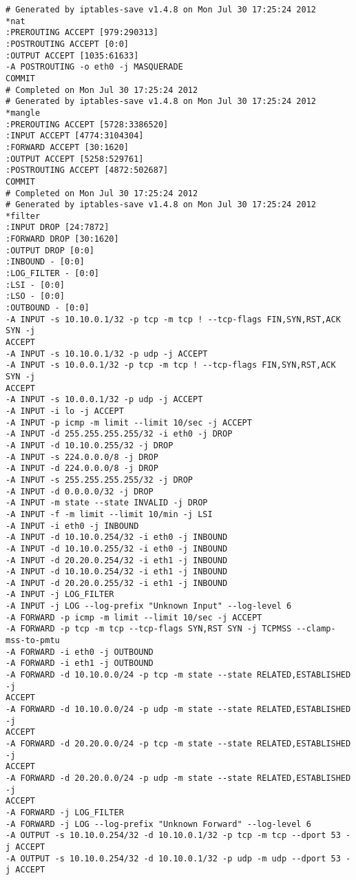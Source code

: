 \documentclass[a4paper,12pt]{report}
\newenvironment{myscriptlisting}
{\begin{list}{}{\setlength{\leftmargin}{1em}}\item\scriptsize\bfseries}
{\end{list}}
\begin{document}
\begin{myscriptlisting}
\begin{verbatim}
# Generated by iptables-save v1.4.8 on Mon Jul 30 17:25:24 2012
*nat
:PREROUTING ACCEPT [979:290313]
:POSTROUTING ACCEPT [0:0]
:OUTPUT ACCEPT [1035:61633]
-A POSTROUTING -o eth0 -j MASQUERADE 
COMMIT
# Completed on Mon Jul 30 17:25:24 2012
# Generated by iptables-save v1.4.8 on Mon Jul 30 17:25:24 2012
*mangle
:PREROUTING ACCEPT [5728:3386520]
:INPUT ACCEPT [4774:3104304]
:FORWARD ACCEPT [30:1620]
:OUTPUT ACCEPT [5258:529761]
:POSTROUTING ACCEPT [4872:502687]
COMMIT
# Completed on Mon Jul 30 17:25:24 2012
# Generated by iptables-save v1.4.8 on Mon Jul 30 17:25:24 2012
*filter
:INPUT DROP [24:7872]
:FORWARD DROP [30:1620]
:OUTPUT DROP [0:0]
:INBOUND - [0:0]
:LOG_FILTER - [0:0]
:LSI - [0:0]
:LSO - [0:0]
:OUTBOUND - [0:0]
-A INPUT -s 10.10.0.1/32 -p tcp -m tcp ! --tcp-flags FIN,SYN,RST,ACK SYN -j
ACCEPT 
-A INPUT -s 10.10.0.1/32 -p udp -j ACCEPT 
-A INPUT -s 10.0.0.1/32 -p tcp -m tcp ! --tcp-flags FIN,SYN,RST,ACK SYN -j
ACCEPT 
-A INPUT -s 10.0.0.1/32 -p udp -j ACCEPT 
-A INPUT -i lo -j ACCEPT 
-A INPUT -p icmp -m limit --limit 10/sec -j ACCEPT 
-A INPUT -d 255.255.255.255/32 -i eth0 -j DROP 
-A INPUT -d 10.10.0.255/32 -j DROP 
-A INPUT -s 224.0.0.0/8 -j DROP 
-A INPUT -d 224.0.0.0/8 -j DROP 
-A INPUT -s 255.255.255.255/32 -j DROP 
-A INPUT -d 0.0.0.0/32 -j DROP 
-A INPUT -m state --state INVALID -j DROP 
-A INPUT -f -m limit --limit 10/min -j LSI 
-A INPUT -i eth0 -j INBOUND 
-A INPUT -d 10.10.0.254/32 -i eth0 -j INBOUND 
-A INPUT -d 10.10.0.255/32 -i eth0 -j INBOUND 
-A INPUT -d 20.20.0.254/32 -i eth1 -j INBOUND 
-A INPUT -d 10.10.0.254/32 -i eth1 -j INBOUND 
-A INPUT -d 20.20.0.255/32 -i eth1 -j INBOUND 
-A INPUT -j LOG_FILTER 
-A INPUT -j LOG --log-prefix "Unknown Input" --log-level 6 
-A FORWARD -p icmp -m limit --limit 10/sec -j ACCEPT 
-A FORWARD -p tcp -m tcp --tcp-flags SYN,RST SYN -j TCPMSS --clamp-mss-to-pmtu 
-A FORWARD -i eth0 -j OUTBOUND 
-A FORWARD -i eth1 -j OUTBOUND 
-A FORWARD -d 10.10.0.0/24 -p tcp -m state --state RELATED,ESTABLISHED -j
ACCEPT 
-A FORWARD -d 10.10.0.0/24 -p udp -m state --state RELATED,ESTABLISHED -j
ACCEPT 
-A FORWARD -d 20.20.0.0/24 -p tcp -m state --state RELATED,ESTABLISHED -j
ACCEPT 
-A FORWARD -d 20.20.0.0/24 -p udp -m state --state RELATED,ESTABLISHED -j
ACCEPT 
-A FORWARD -j LOG_FILTER 
-A FORWARD -j LOG --log-prefix "Unknown Forward" --log-level 6 
-A OUTPUT -s 10.10.0.254/32 -d 10.10.0.1/32 -p tcp -m tcp --dport 53 -j ACCEPT 
-A OUTPUT -s 10.10.0.254/32 -d 10.10.0.1/32 -p udp -m udp --dport 53 -j ACCEPT 

\end{verbatim}
\end{myscriptlisting}
\end{document}
